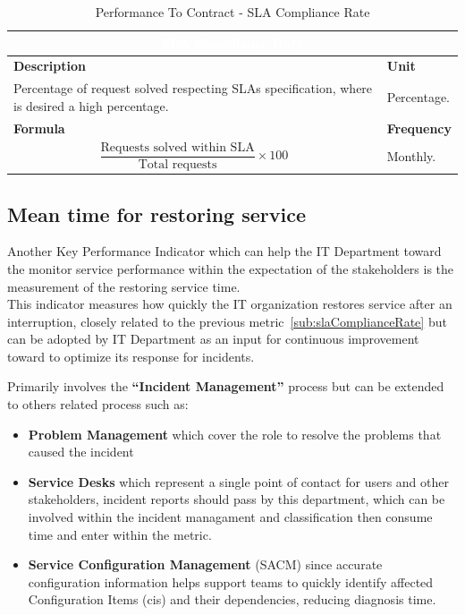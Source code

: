 \begin{table}[h]
    \centering
    \renewcommand{\arraystretch}{1.6}
    \setlength{\arrayrulewidth}{0.6pt}

    \begin{tabularx}{\textwidth}{|X|X|}
    \hline
    \multicolumn{2}{|c|}{\cellcolor{mcblue}\textcolor{white}{\textbf{SLA Compliance Rate}}} \\ \hline

    \rowcolor{mclightgray}
    \textbf{Description} & \textbf{Unit} \\ \hline
    Percentage of request solved respecting SLAs specification, where is desired a high percentage. &
    Percentage. \\ \hline

    \rowcolor{mclightgray}
    \textbf{Formula} & \textbf{Frequency} \\ \hline
    \[
        \frac{\text{Requests solved within SLA}}{\text{Total requests}} \times 100
    \]
     &
    Monthly. \\ \hline

    \end{tabularx}

    \caption{Performance To Contract - SLA  Compliance Rate}
    \label{tab:measurement_SLAComplianceRate}
\end{table}


\subsection{Mean time for restoring service}
\label{sub:meantTimeRestore}
Another Key Performance Indicator which can help the IT Department toward the monitor service performance within the expectation of the stakeholders is the measurement of the restoring service time.\\
This indicator measures how quickly the IT organization restores service after an interruption, closely related to the previous metric~\ref{sub:slaComplianceRate} but can be adopted by IT Department as an input for continuous improvement toward to optimize its response for incidents.

Primarily involves the \textbf{``Incident Management''} process but can be extended to others related process such as:
\begin{itemize}
    \item \textbf{Problem Management} which cover the role to resolve the problems that caused the incident
    \item \textbf{Service Desks} which represent a single point of contact for users and other stakeholders, incident reports should pass by this department, which can be involved within the incident managament and classification then consume time and enter within the metric.
    \item \textbf{Service Configuration Management} (SACM) since accurate configuration information helps support teams to quickly identify affected Configuration Items (\gls{ci}s) and their dependencies, reducing diagnosis time. 
\end{itemize}

